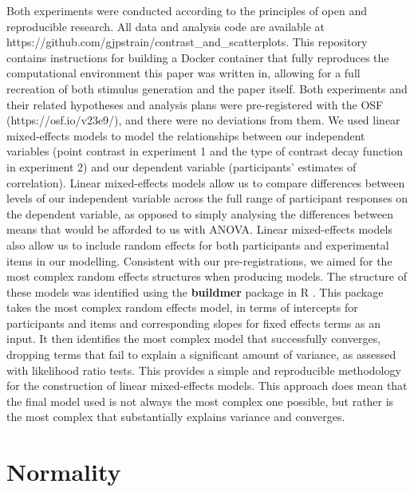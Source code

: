 \documentclass[preprint, 3p,
authoryear]{elsarticle} %
\begin{document}
Both experiments were conducted according to the principles of open and
reproducible research. All data and analysis code are available at
https://github.com/gjpstrain/contrast\_and\_scatterplots. This
repository contains instructions for building a Docker container that
fully reproduces the computational environment this paper was written
in, allowing for a full recreation of both stimulus generation and the
paper itself. Both experiments and their related hypotheses and analysis
plans were pre-registered with the OSF (https://osf.io/v23e9/), and
there were no deviations from them. We used linear mixed-effects models
to model the relationships between our independent variables (point
contrast in experiment 1 and the type of contrast decay function in
experiment 2) and our dependent variable (participants' estimates of
correlation). Linear mixed-effects models allow us to compare
differences between levels of our independent variable across the full
range of participant responses on the dependent variable, as opposed to
simply analysing the differences between means that would be afforded to
us with ANOVA. Linear mixed-effects models also allow us to include
random effects for both participants and experimental items in our
modelling. Consistent with our pre-registrations, we aimed for the most
complex random effects structures when producing models. The structure
of these models was identified using the \textbf{buildmer} package in R
\citep{voeten_buildmer_2022}. This package takes the most complex random
effects model, in terms of intercepts for participants and items and
corresponding slopes for fixed effects terms as an input. It then
identifies the most complex model that successfully converges, dropping
terms that fail to explain a significant amount of variance, as assessed
with likelihood ratio tests. This provides a simple and reproducible
methodology for the construction of linear mixed-effects models. This
approach does mean that the final model used is not always the most
complex one possible, but rather is the most complex that substantially
explains variance and converges.

\hypertarget{normality}{%
\section{Normality}\label{normality}}
\end{document}

